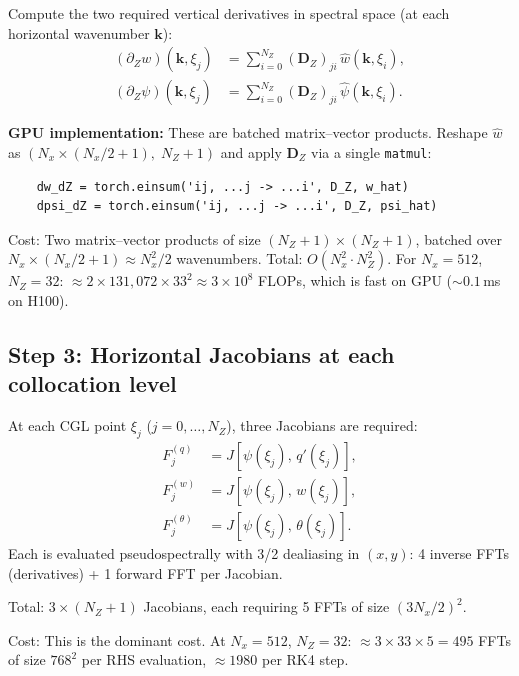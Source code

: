 \documentclass[11pt]{article}
\newcommand{\Jac}[2]{J\!\left[#1,\,#2\right]}
\newcommand{\hhat}[1]{\widehat{#1}}
\newcommand{\Dvec}{\bm{D}}
\begin{document}
Compute the two required vertical derivatives in spectral space (at each horizontal wavenumber $\bm{k}$):
\begin{align}
(\partial_Z w)(\bm{k}, \xi_j) &= \sum_{i=0}^{N_Z} (\Dvec_Z)_{ji}\, \hhat{w}(\bm{k}, \xi_i),\\
(\partial_Z \psi)(\bm{k}, \xi_j) &= \sum_{i=0}^{N_Z} (\Dvec_Z)_{ji}\, \hhat\psi(\bm{k}, \xi_i).
\end{align}

\textbf{GPU implementation:} These are batched matrix--vector products. Reshape $\hhat{w}$ as $(N_x \times (N_x/2+1),\; N_Z+1)$ and apply $\Dvec_Z$ via a single \texttt{matmul}:
\begin{verbatim}
    dw_dZ = torch.einsum('ij, ...j -> ...i', D_Z, w_hat)
    dpsi_dZ = torch.einsum('ij, ...j -> ...i', D_Z, psi_hat)
\end{verbatim}

Cost: Two matrix--vector products of size $(N_Z+1) \times (N_Z+1)$, batched over $N_x \times (N_x/2+1) \approx N_x^2/2$ wavenumbers. Total: $O(N_x^2 \cdot N_Z^2)$. For $N_x = 512$, $N_Z = 32$: $\approx 2 \times 131{,}072 \times 33^2 \approx 3 \times 10^8$ FLOPs, which is fast on GPU ($\sim 0.1$\,ms on H100).

\subsection{Step 3: Horizontal Jacobians at each collocation level}

At each CGL point $\xi_j$ ($j = 0, \ldots, N_Z$), three Jacobians are required:
\begin{align}
F^{(q)}_j &= \Jac{\psi(\xi_j)}{q'(\xi_j)}, \\
F^{(w)}_j &= \Jac{\psi(\xi_j)}{w(\xi_j)}, \\
F^{(\theta)}_j &= \Jac{\psi(\xi_j)}{\theta(\xi_j)}.
\end{align}
Each is evaluated pseudospectrally with 3/2 dealiasing in $(x,y)$: 4 inverse FFTs (derivatives) + 1 forward FFT per Jacobian.

Total: $3 \times (N_Z + 1)$ Jacobians, each requiring 5 FFTs of size $(3N_x/2)^2$.

Cost: This is the dominant cost. At $N_x = 512$, $N_Z = 32$: $\approx 3 \times 33 \times 5 = 495$ FFTs of size $768^2$ per RHS evaluation, $\approx 1980$ per RK4 step.

\end{document}
